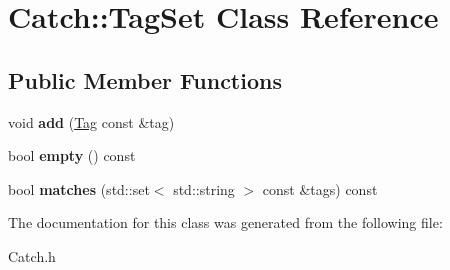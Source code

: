\hypertarget{class_catch_1_1_tag_set}{\section{Catch\-:\-:Tag\-Set Class Reference}
\label{class_catch_1_1_tag_set}
}
\subsection*{Public Member Functions}
\begin{DoxyCompactItemize}
\item 
\hypertarget{class_catch_1_1_tag_set_aee4ac50048b95e38ee2ee90cdbd2f2d7}{void {\bfseries add} (\hyperlink{class_catch_1_1_tag}{Tag} const \&tag)}\label{class_catch_1_1_tag_set_aee4ac50048b95e38ee2ee90cdbd2f2d7}

\item 
\hypertarget{class_catch_1_1_tag_set_aaa7ba754671a5ff17261f214adb9164c}{bool {\bfseries empty} () const }\label{class_catch_1_1_tag_set_aaa7ba754671a5ff17261f214adb9164c}

\item 
\hypertarget{class_catch_1_1_tag_set_a33fffe93717ff00ab9552a5e59ebeec1}{bool {\bfseries matches} (std\-::set$<$ std\-::string $>$ const \&tags) const }\label{class_catch_1_1_tag_set_a33fffe93717ff00ab9552a5e59ebeec1}

\end{DoxyCompactItemize}


The documentation for this class was generated from the following file\-:\begin{DoxyCompactItemize}
\item 
Catch.\-h\end{DoxyCompactItemize}
